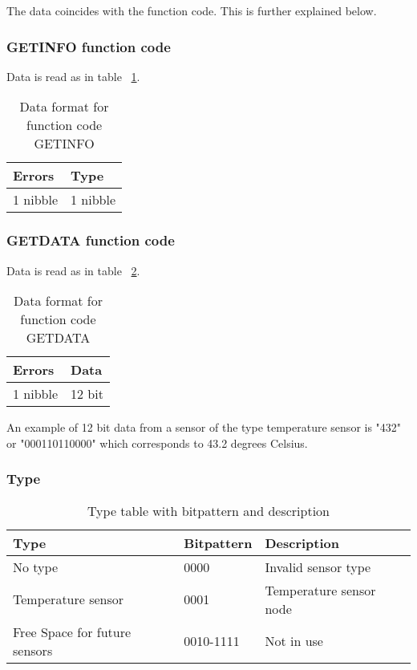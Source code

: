 The data coincides with the function code. This is further explained below.
\subsubsection{GETINFO function code}
Data is read as in table ~\ref{table:Datagetinfo}.
\begin{table}[H]
\centering
\begin{tabular}{|l|l|}
	\hline
	Errors & Type \\ \hline
	1 nibble & 1 nibble \\
	\hline
\end{tabular}
\caption{Data format for function code GETINFO }
\label{table:Datagetinfo}
\end{table}
\subsubsection{GETDATA function code}
Data is read as in table ~\ref{table:Datagetdata}.
\begin{table}[H]
\centering
\begin{tabular}{|l|l|}
	\hline
	Errors & Data \\ \hline
	1 nibble &  12 bit \\
	\hline
\end{tabular}
\caption{Data format for function code GETDATA }
\label{table:Datagetdata}
\end{table}
An example of 12 bit data from a sensor of the type temperature sensor is "432" or "000110110000" which corresponds to 43.2 degrees Celsius.

\subsubsection{Type}
\begin{table}[H]
\centering
\begin{tabular}{|l|l|l|}
	\hline
	Type & Bitpattern & Description \\ 
	\hline
	No type 	& 0000 & Invalid sensor type \\
	\hline
	Temperature sensor & 0001 & Temperature sensor node \\
	\hline
	Free Space for future sensors & 0010-1111 & Not in use \\ \hline
	
\end{tabular}
\caption{Type table with bitpattern and description}
\label{table:typetable}
\end{table}

